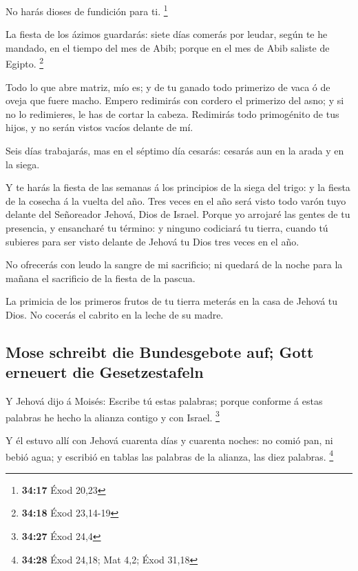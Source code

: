  No harás dioses de fundición para ti. \footnote{\textbf{34:17}
  Éxod 20,23}

 La fiesta de los ázimos guardarás: siete días comerás por
leudar, según te he mandado, en el tiempo del mes de Abib; porque en el
mes de Abib saliste de Egipto. \footnote{\textbf{34:18} Éxod 23,14-19}

 Todo lo que abre matriz, mío es; y de tu ganado todo
primerizo de vaca ó de oveja que fuere macho.  Empero
redimirás con cordero el primerizo del asno; y si no lo redimieres, le
has de cortar la cabeza. Redimirás todo primogénito de tus hijos, y no
serán vistos vacíos delante de mí.

 Seis días trabajarás, mas en el séptimo día cesarás:
cesarás aun en la arada y en la siega.

 Y te harás la fiesta de las semanas á los principios de la
siega del trigo: y la fiesta de la cosecha á la vuelta del año.
 Tres veces en el año será visto todo varón tuyo delante
del Señoreador Jehová, Dios de Israel.  Porque yo arrojaré
las gentes de tu presencia, y ensancharé tu término: y ninguno codiciará
tu tierra, cuando tú subieres para ser visto delante de Jehová tu Dios
tres veces en el año.

 No ofrecerás con leudo la sangre de mi sacrificio; ni
quedará de la noche para la mañana el sacrificio de la fiesta de la
pascua.

 La primicia de los primeros frutos de tu tierra meterás en
la casa de Jehová tu Dios. No cocerás el cabrito en la leche de su
madre.

\hypertarget{mose-schreibt-die-bundesgebote-auf-gott-erneuert-die-gesetzestafeln}{%
\subsection{Mose schreibt die Bundesgebote auf; Gott erneuert die
Gesetzestafeln}\label{mose-schreibt-die-bundesgebote-auf-gott-erneuert-die-gesetzestafeln}}

 Y Jehová dijo á Moisés: Escribe tú estas palabras; porque
conforme á estas palabras he hecho la alianza contigo y con Israel.
\footnote{\textbf{34:27} Éxod 24,4}

 Y él estuvo allí con Jehová cuarenta días y cuarenta
noches: no comió pan, ni bebió agua; y escribió en tablas las palabras
de la alianza, las diez palabras. \footnote{\textbf{34:28} Éxod 24,18;
  Mat 4,2; Éxod 31,18}

